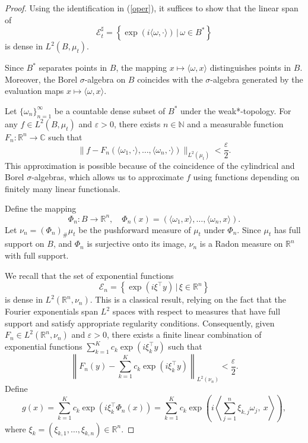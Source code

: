 \documentclass[11pt]{amsart}
\theoremstyle{definition}
\theoremstyle{remark}
\numberwithin{equation}{section}
\begin{document}
\begin{proof}

Using the identification in (\ref{oper}), it suffices to show that the linear span of \[
\mathcal{E}_t^\sharp = \left\{ \exp\left( i \langle \omega, \cdot \rangle \right)\,|\, \omega \in B^* \right\}
\] is dense in \( L^2(B, \mu_t) \).

Since \( B^* \) separates points in \( B \), the mapping \( x \mapsto \langle \omega, x \rangle \) distinguishes points in \( B \). Moreover, the Borel \(\sigma\)-algebra on \( B \) coincides with the $\sigma$-algebra generated by the evaluation maps \(x\mapsto \langle \omega, x \rangle \).

Let \( \{ \omega_n \}_{n=1}^\infty \) be a countable dense subset of \( B^* \) under the weak*-topology. For any \( f \in L^2(B, \mu_t) \) and \( \varepsilon > 0 \), there exists \( n \in \mathbb{N} \) and a measurable function \( F_n : \mathbb{R}^n \to \mathbb{C} \) such that
\[
\| f - F_n(\langle \omega_1, \cdot \rangle, \ldots, \langle \omega_n, \cdot \rangle) \|_{L^2(\mu_t)} < \frac{\varepsilon}{2}.
\]
This approximation is possible because of the coincidence of the cylindrical and Borel \(\sigma\)-algebras, which allows us to approximate \( f \) using functions depending on finitely many linear functionals.

Define the mapping
\[
\Phi_n : B \to \mathbb{R}^n, \quad \Phi_n(x) = \left( \langle \omega_1, x \rangle, \ldots, \langle \omega_n, x \rangle \right).
\]
Let \( \nu_n = (\Phi_n)_\# \mu_t \) be the pushforward measure of \( \mu_t \) under \( \Phi_n \). Since \( \mu_t \) has full support on \( B \), and \( \Phi_n \) is surjective onto its image, \( \nu_n \) is a Radon measure on \( \mathbb{R}^n \) with full support.

We recall that the set of exponential functions
\[
\mathcal{E}_n = \left\{ \exp\left( i \xi^\top y \right)\,|\, \xi \in \mathbb{R}^n \right\}
\]
is dense in \( L^2(\mathbb{R}^n, \nu_n) \). This is a classical result, relying on the fact that the Fourier exponentials span \( L^2 \) spaces with respect to measures that have full support and satisfy appropriate regularity conditions. Consequently, given \( F_n \in L^2(\mathbb{R}^n, \nu_n) \) and \( \varepsilon > 0 \), there exists a finite linear combination of exponential functions \( \sum_{k=1}^K c_k \exp(i \xi_k^\top y) \) such that
\[
\left\| F_n(y) - \sum_{k=1}^K c_k \exp(i \xi_k^\top y) \right\|_{L^2(\nu_n)} < \frac{\varepsilon}{2}.
\]
Define
\[
g(x) = \sum_{k=1}^K c_k \exp\left( i \xi_k^\top \Phi_n(x) \right) = \sum_{k=1}^K c_k \exp\left( i \left\langle \sum_{j=1}^n \xi_{k,j} \omega_j, \ x \right\rangle \right),
\]
where \( \xi_k = (\xi_{k,1}, \ldots, \xi_{k,n}) \in \mathbb{R}^n \).


\end{proof}
\end{document}
